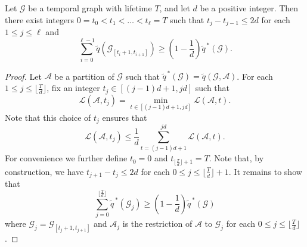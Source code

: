 \documentclass[runningheads]{llncs}
\newcommand{\cA}{\mathcal{A}}
\newcommand{\cG}{\mathcal{G}}
\newcommand{\loy}{\mathcal{L}}
\begin{document}
\begin{lemma}\label{lem:interval-approx-lb}
    Let $\cG$ be a temporal graph with lifetime $T$, and let $d$ be a positive integer.  Then there exist integers $0 = t_0 < t_1 < \dots < t_\ell = T$ such that $t_j - t_{j-1} \leq 2d$ for each $1 \leq j \leq \ell$ and 
        $$ \sum_{i=0}^{\ell-1} \widetilde{q}(\cG_{[t_i+1,t_{i+1}]}) \geq \left(1 - \frac{1}{d}\right) \widetilde{q}^{\,*}(\cG).$$
\end{lemma}
\begin{proof}
    Let $\cA$ be a partition of $\cG$ such that $\widetilde{q}^{\,*}(\cG) = \widetilde{q}(\cG,\cA)$.  For each $1 \leq j \leq \lfloor \frac{T}{d} \rfloor$, fix an integer $t_j \in [(j-1)d + 1, j d]$ such that 
        $$\loy(\cA,t_j) = \min_{t \in [(j-1)d + 1, j d]} \loy(\cA,t).$$
    Note that this choice of $t_j$ ensures that
    \begin{equation}\label{lem3:min_bounded_by_av}
        \loy(\cA,t_j) \leq \frac{1}{d} \sum_{t=(j-1)d+1}^{jd} \loy(\cA,t).
    \end{equation}
    For convenience we further define $t_0 = 0$ and $t_{\lfloor \frac{T}{d} \rfloor + 1} = T$.  Note that, by construction, we have $t_{j+1} - t_j \leq 2d$ for each $0 \leq j \leq \lfloor \frac{T}{d} \rfloor + 1$.  It remains to show that 
        $$\sum_{j=0}^{\lfloor \frac{T}{d} \rfloor} \widetilde{q}^{\,*}(\cG_j) 
 \geq \left(1 - \frac{1}{d}\right) \widetilde{q}^{\,*}(\cG)$$ 
    where $\cG_j = \cG_{[t_j+1,t_{j+1}]}$ and $\cA_j$ is the restriction of $\cA$ to $\cG_j$ for each $0 \leq j \leq \lfloor \frac{T}{d} \rfloor$.


\end{proof}
\end{document}
